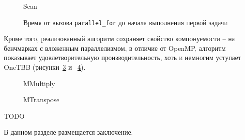 \documentclass[times,specification,annotation]{itmo-student-thesis}
\begin{document}
\begin{figure}[!t]
    \centering
        
    \caption{Scan}\label{Fig:ScanFinal}
\end{figure}

\begin{figure}[t!]
\centering

\caption{Время от вызова \texttt{parallel\_for} до начала выполнения первой задачи}\label{Fig:SchedulingTimeFinal}
\end{figure}

Кроме того, реализованный алгоритм сохраняет свойство компонуемости -- на бенчмарках с вложенным параллелизмом, в отличие от OpenMP, алгоритм показывает удовлетворительную производительность, хоть и немногим уступает OneTBB (рисунки~\ref{Fig:MmulFinal} и ~\ref{Fig:MtransposeFinal}).

\begin{figure}[!htb]
    \centering
        
    \caption{MMultiply}\label{Fig:MmulFinal}
\end{figure}

\begin{figure}[!htb]
    \centering
        
    \caption{MTranspose}\label{Fig:MtransposeFinal}
\end{figure}

\chapterconclusion

TODO

\startconclusionpage

В данном разделе размещается заключение.

\printmainbibliography

\appendix
\end{document}
